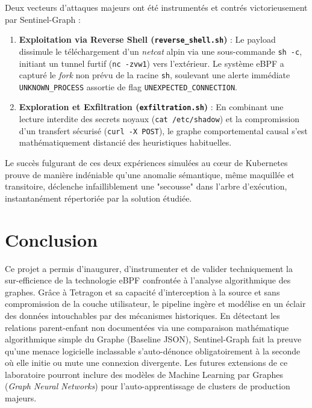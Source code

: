 \documentclass[a4paper,12pt]{article}
\begin{document}
Deux vecteurs d'attaques majeurs ont été instrumentés et contrés victorieusement par Sentinel-Graph :
\begin{enumerate}
    \item \textbf{Exploitation via Reverse Shell (\texttt{reverse\_shell.sh})} : Le payload dissimule le téléchargement d'un \textit{netcat} alpin via une sous-commande \texttt{sh -c}, initiant un tunnel furtif (\texttt{nc -zvw1}) vers l'extérieur. Le système eBPF a capturé le \textit{fork} non prévu de la racine \texttt{sh}, soulevant une alerte immédiate \texttt{UNKNOWN\_PROCESS} assortie de flag \texttt{UNEXPECTED\_CONNECTION}.
    \item \textbf{Exploration et Exfiltration (\texttt{exfiltration.sh})} : En combinant une lecture interdite des secrets noyaux (\texttt{cat /etc/shadow}) et la compromission d'un transfert sécurisé (\texttt{curl -X POST}), le graphe comportemental causal s'est mathématiquement distancié des heuristiques habituelles.
\end{enumerate}

Le succès fulgurant de ces deux expériences simulées au cœur de Kubernetes prouve de manière indéniable qu'une anomalie sémantique, même maquillée et transitoire, déclenche infailliblement une "secousse" dans l'arbre d'exécution, instantanément répertoriée par la solution étudiée.

\section{Conclusion}

Ce projet a permis d'inaugurer, d'instrumenter et de valider techniquement la sur-efficience de la technologie eBPF confrontée à l'analyse algorithmique des graphes. Grâce à Tetragon et sa capacité d'interception à la source et sans compromission de la couche utilisateur, le pipeline ingère et modélise en un éclair des données intouchables par des mécanismes historiques.
En détectant les relations parent-enfant non documentées via une comparaison mathématique algorithmique simple du Graphe (Baseline JSON), Sentinel-Graph fait la preuve qu'une menace logicielle inclassable s'auto-dénonce obligatoirement à la seconde où elle initie ou mute une connexion divergente.
Les futures extensions de ce laboratoire pourront inclure des modèles de Machine Learning par Graphes (\textit{Graph Neural Networks}) pour l'auto-apprentissage de clusters de production majeurs.
\end{document}
